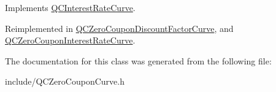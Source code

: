 Implements \hyperlink{class_q_c_interest_rate_curve_a0a73e8506d0706becd93b04c4499a9c6}{Q\+C\+Interest\+Rate\+Curve}.



Reimplemented in \hyperlink{class_q_c_zero_coupon_discount_factor_curve_a00da6a6176e027de613935504683e254}{Q\+C\+Zero\+Coupon\+Discount\+Factor\+Curve}, and \hyperlink{class_q_c_zero_coupon_interest_rate_curve_a7841822e2b1291753582dd4ec92269e2}{Q\+C\+Zero\+Coupon\+Interest\+Rate\+Curve}.



The documentation for this class was generated from the following file\+:\begin{DoxyCompactItemize}
\item 
include/Q\+C\+Zero\+Coupon\+Curve.\+h\end{DoxyCompactItemize}
